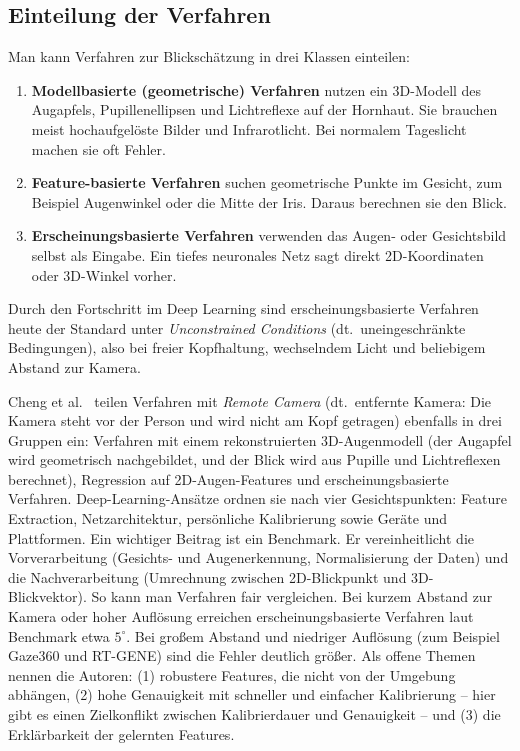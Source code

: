 \subsection{Einteilung der Verfahren}
\label{subsec:taxonomie}
Man kann Verfahren zur Blickschätzung in drei Klassen einteilen:
\begin{enumerate}
  \item \textbf{Modellbasierte (geometrische) Verfahren} nutzen ein 3D-Modell
        des Augapfels, Pupillenellipsen und Lichtreflexe auf der Hornhaut. Sie
        brauchen meist hochaufgelöste Bilder und Infrarotlicht. Bei normalem
        Tageslicht machen sie oft Fehler.
  \item \textbf{Feature-basierte Verfahren} suchen geometrische Punkte im
        Gesicht, zum Beispiel Augenwinkel oder die Mitte der Iris. Daraus
        berechnen sie den Blick.
  \item \textbf{Erscheinungsbasierte Verfahren} verwenden das Augen- oder
        Gesichtsbild selbst als Eingabe. Ein tiefes neuronales Netz sagt direkt
        2D-Koordinaten oder 3D-Winkel vorher.
\end{enumerate}
Durch den Fortschritt im Deep Learning sind erscheinungsbasierte Verfahren
heute der Standard unter \emph{Unconstrained Conditions} (dt.\
uneingeschränkte Bedingungen), also bei freier Kopfhaltung, wechselndem Licht
und beliebigem Abstand zur Kamera.

Cheng et al.~\cite{cheng2024review} teilen Verfahren mit \emph{Remote Camera}
(dt.\ entfernte Kamera: Die Kamera steht vor der Person und wird nicht am
Kopf getragen) ebenfalls in drei Gruppen ein: Verfahren mit einem
rekonstruierten 3D-Augenmodell (der Augapfel wird geometrisch nachgebildet,
und der Blick wird aus Pupille und Lichtreflexen berechnet), Regression auf
2D-Augen-Features und erscheinungsbasierte Verfahren. Deep-Learning-Ansätze ordnen sie nach vier Gesichtspunkten:
Feature Extraction, Netzarchitektur, persönliche Kalibrierung sowie Geräte und
Plattformen. Ein wichtiger Beitrag ist ein Benchmark. Er vereinheitlicht die
Vorverarbeitung (Gesichts- und Augenerkennung, Normalisierung der Daten) und
die Nachverarbeitung (Umrechnung zwischen 2D-Blickpunkt und 3D-Blickvektor).
So kann man Verfahren fair vergleichen. Bei kurzem Abstand zur Kamera oder
hoher Auflösung erreichen erscheinungsbasierte Verfahren laut Benchmark etwa
$5^\circ$. Bei großem Abstand und niedriger Auflösung (zum Beispiel Gaze360 und
RT-GENE) sind die Fehler deutlich größer. Als offene Themen nennen die Autoren:
(1) robustere Features, die nicht von der Umgebung abhängen, (2) hohe
Genauigkeit mit schneller und einfacher Kalibrierung -- hier gibt es einen
Zielkonflikt zwischen Kalibrierdauer und Genauigkeit -- und (3) die
Erklärbarkeit der gelernten Features.

